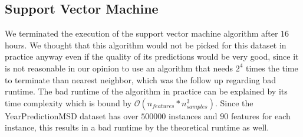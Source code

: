 \subsection{Support Vector Machine}\label{ds2:svm}
We terminated the execution of the support vector machine algorithm after $16$ hours. We thought that this algorithm would not be picked for this dataset in practice anyway even if the quality of its predictions would be very good, since it is not reasonable in our opinion to use an algorithm that needs $2^4$ times the time to terminate than nearest neighbor, which was the follow up regarding bad runtime.
The bad runtime of the algorithm in practice can be explained by its time complexity which is bound by $\mathcal{O}(n_{features}*n_{samples}^3)$. Since the YearPredictionMSD dataset has over $500000$ instances and $90$ features for each instance, this results in a bad runtime by the theoretical runtime as well.
